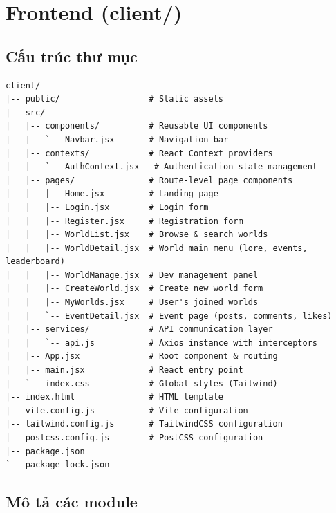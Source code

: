 \documentclass[12pt,a4paper]{article}
\begin{document}
\section{Frontend (client/)}

\subsection{Cấu trúc thư mục}

\begin{lstlisting}[title={\textbf{client/}}]
client/
|-- public/                  # Static assets
|-- src/
|   |-- components/          # Reusable UI components
|   |   `-- Navbar.jsx       # Navigation bar
|   |-- contexts/            # React Context providers
|   |   `-- AuthContext.jsx   # Authentication state management
|   |-- pages/               # Route-level page components
|   |   |-- Home.jsx         # Landing page
|   |   |-- Login.jsx        # Login form
|   |   |-- Register.jsx     # Registration form
|   |   |-- WorldList.jsx    # Browse & search worlds
|   |   |-- WorldDetail.jsx  # World main menu (lore, events, leaderboard)
|   |   |-- WorldManage.jsx  # Dev management panel
|   |   |-- CreateWorld.jsx  # Create new world form
|   |   |-- MyWorlds.jsx     # User's joined worlds
|   |   `-- EventDetail.jsx  # Event page (posts, comments, likes)
|   |-- services/            # API communication layer
|   |   `-- api.js           # Axios instance with interceptors
|   |-- App.jsx              # Root component & routing
|   |-- main.jsx             # React entry point
|   `-- index.css            # Global styles (Tailwind)
|-- index.html               # HTML template
|-- vite.config.js           # Vite configuration
|-- tailwind.config.js       # TailwindCSS configuration
|-- postcss.config.js        # PostCSS configuration
|-- package.json
`-- package-lock.json
\end{lstlisting}

\subsection{Mô tả các module}
\end{document}
